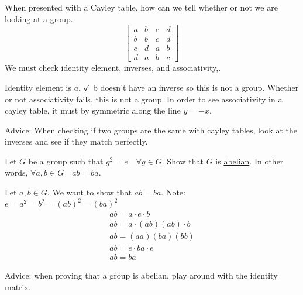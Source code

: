 \documentclass[class=scrartcl, crop=false]{standalone}
\begin{document}
\begin{example}
  When presented with a Cayley table, how can we tell whether or not we are looking at a group.
  \[
    \begin{bmatrix}
      a & b & c & d \\
      b & b & c & d \\
      c & d & a & b \\
      d & a & b & c
    \end{bmatrix}
  \]
  We must check identity element, inverses, and associativity,.

  \begin{enumerate}
    \ii Identity element is $a$. $\checkmark$
    \ii b doesn't have an inverse so this is not a group.
    \ii Whether or not associativity fails, this is not a group. In order to see associativity in a cayley table, it must by symmetric along the line $y = -x$.
  \end{enumerate}

  Advice: When checking if two groups are the same with cayley tables, look at the inverses and see if they match perfectly.
\end{example}

\begin{exercise}
  Let $G$ be a group such that $g^2 = e \quad \forall g \in G$. Show that $G$ is \ul{abelian}. In other words, $\forall a, b \in G \quad ab = ba$.

  \begin{soln}
    Let $a, b\in G$. We want to show that $ab = ba$. Note: $e = a^2 = b^2 = (ab)^2 = (ba)^2$
    \begin{align*}
      ab = a \cdot e \cdot b \\
      ab = a \cdot (ab)(ab) \cdot b \\
      ab = (aa)(ba)(bb) \\
      ab = e \cdot ba \cdot e \\
      ab = ba
    \end{align*}
  \end{soln}
  Advice: when proving that a group is abelian, play around with the identity matrix.
\end{exercise}
\end{document}

